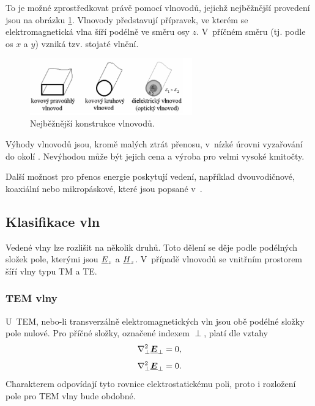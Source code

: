 To je možné zprostředkovat právě pomocí vlnovodů, jejichž nejběžnější provedení jsou na obrázku \ref{obr:evlny_vlnovody_konstrukce}. Vlnovody představují přípravek, ve kterém se elektromagnetická vlna šíří podélně ve směru osy $z$. V~příčném směru (tj. podle os $x$ a $y$) vzniká tzv. stojaté vlnění.
\begin{figure}[!h]
	\centering
	\includegraphics[width=7cm]{evlny_vlnovody_konstrukce.png}
	\caption{Nejběžnější konstrukce vlnovodů. \cite{emp}}
	\label{obr:evlny_vlnovody_konstrukce}
\end{figure}
Výhody vlnovodů jsou, kromě malých ztrát přenosu, v~nízké úrovni vyzařování do okolí  . Nevýhodou může být jejich cena a výroba pro velmi vysoké kmitočty. 

Další možnost pro přenos energie poskytují vedení, například dvouvodičnové, koaxiální nebo mikropáskové, které jsou popsané v~\cite{emp}.

\subsection{Klasifikace vln}
Vedené vlny lze rozlišit na několik druhů. Toto dělení se děje podle podélných složek pole, kterými jsou ${\underline{E}}_{z}$ a ${\underline{H}}_{z}$. V~případě vlnovodů se vnitřním prostorem šíří vlny typu TM a TE.

\subsubsection*{TEM vlny}
U~TEM, nebo-li transverzálně elektromagnetických vln jsou obě podélné složky pole nulové. Pro příčné složky, označené indexem $\perp$, platí dle \cite{emp} vztahy
\begin{displaymath}
	\nabla^{2}_{\perp} \mbox{\underline{\boldmath$E$}}_{\perp} = 0,
\end{displaymath}
\begin{displaymath}
	\nabla^{2}_{\perp} \mbox{\underline{\boldmath$E$}}_{\perp} = 0.
\end{displaymath}
Charakterem odpovídají tyto rovnice elektrostatickému poli, proto i rozložení pole pro TEM vlny bude obdobné.

